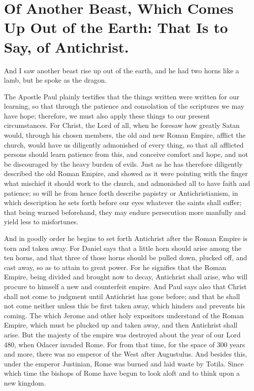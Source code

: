 \chapter[Sermon 58. Of Another Beast, Which Comes Up Out of the Earth: That Is to Say, of Antichrist.]{Of Another Beast, Which Comes Up Out of the Earth: That Is to Say, of Antichrist.}
\label{sermon:058}

And I saw another beast rise up out of the earth, and he had two horns like a lamb, but he spoke as the dragon.

The Apostle Paul plainly testifies that the things written were written for our learning, so that through the patience and consolation of the scriptures we may have hope; therefore, we must also apply these things to our present circumstances. For Christ, the Lord of all, when he foresaw how greatly Satan would, through his chosen members, the old and new Roman Empire, afflict the church, would have us diligently admonished of every thing, so that all afflicted persons should learn patience from this, and conceive comfort and hope, and not be discouraged by the heavy burden of evils. Just as he has therefore diligently described the old Roman Empire, and showed as it were pointing with the finger what mischief it should work to the church, and admonished all to have faith and patience; so will he from hence forth describe papistry or Antichristianism, in which description he sets forth before our eyes whatever the saints shall suffer; that being warned beforehand, they may endure persecution more manfully and yield less to misfortunes.

And in goodly order he begins to set forth Antichrist after the Roman Empire is torn and taken away. For Daniel says that a little horn should arise among the ten horns, and that three of those horns should be pulled down, plucked off, and cast away, so as to attain to great power. For he signifies that the Roman Empire, being divided and brought now to decay, Antichrist shall arise, who will procure to himself a new and counterfeit empire. And Paul says also that Christ shall not come to judgment until Antichrist has gone before; and that he shall not come neither unless this be first taken away, which hinders and prevents his coming. The which Jerome and other holy expositors understand of the Roman Empire, which must be plucked up and taken away, and then Antichrist shall arise. But the majesty of the empire was destroyed about the year of our Lord 480, when Odacer invaded Rome. For from that time, for the space of 300 years and more, there was no emperor of the West after Augustulus. And besides this, under the emperor Justinian, Rome was burned and laid waste by Totila. Since which time the bishops of Rome have begun to look aloft and to think upon a new kingdom.

